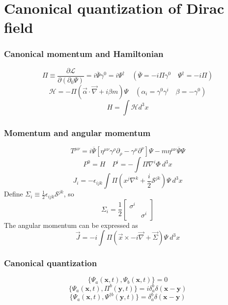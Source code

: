 \section{Canonical quantization of Dirac field}
\subsubsection{Canonical momentum and Hamiltonian}
\[\Pi \equiv \frac{\partial \mathcal{L}}{\partial(\partial_0 \Psi)} = i \overline{\Psi}\gamma^0 = i \Psi^{\dagger} \quad (\overline{\Psi} = -i \Pi \gamma^0 \quad \Psi^{\dagger} = -i \Pi)\]
\[\mathcal{H} = -\Pi (\vec{\alpha} \cdot \vec{\nabla} + i \beta m)\Psi \quad (\alpha_i = \gamma^0 \gamma^i \quad \beta = -\gamma^0)\]
\[H = \int \mathcal{H} d^3x\]
\subsubsection{Momentum and angular momentum}
\[T^{\mu \nu} = i \overline{\Psi} \left[ \eta^{\mu \nu} \gamma^{\rho} \partial_{\rho} - \gamma^{\mu} \partial^{\nu} \right]\Psi -m \eta^{\mu \nu} \overline{\Psi}\Psi\]
\[P^0 = H \quad P^i = -\int \Pi \nabla^i \Phi \: d^3x\]
\[J_i = -\epsilon_{ijk} \int \Pi( x^j \nabla^k + \frac{i}{2} \mathcal{S}^{jk}) \Psi  \: d^3x \]
Define $\Sigma_i \equiv \frac{1}{2} \epsilon_{ijk} \mathcal{S}^{jk}$, so
\[\Sigma_i = \frac{1}{2}\left[ \begin{matrix} \sigma^i & \\ & \sigma^i \end{matrix} \right] \]
The angular momentum can be expressed as
\[\vec{J} = -i \int \Pi( \vec{x} \times -i\vec{\nabla} +  \vec{\Sigma}) \Psi \: d^3x \]
\subsubsection{Canonical quantization}
\[\{\Psi_a(\bm{x},t),\Psi_b(\bm{x},t)\} = 0\]
\[\{\Psi_a(\bm{x},t),\Pi^b(\bm{y},t)\} = i\delta^b_a \delta(\bm{x}-\bm{y})\]
\[\{\Psi_a(\bm{x},t),\Psi^{\dagger b}(\bm{y},t)\} = \delta^b_a \delta(\bm{x}-\bm{y})\]

